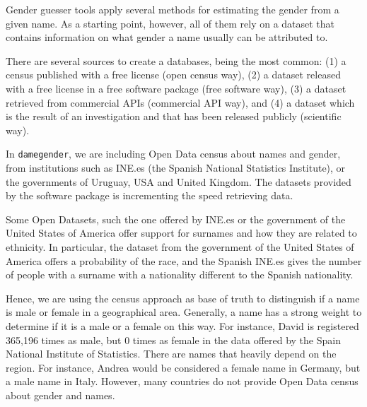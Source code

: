 \documentclass[a4paper]{article}
\begin{document}
Gender guesser tools apply several methods for estimating the gender from a given name. 
As a starting point, however, all of them rely on a dataset that contains information on what gender a name usually can be attributed to.

There are several sources to create a databases, being the most common:  
(1) a census published with a free license (open census way), 
(2) a dataset released with a free license in a free software package (free software way), 
(3) a dataset retrieved from commercial APIs (commercial API way), and
(4) a dataset which is the result of an investigation and that has been released publicly (scientific way).

In \texttt{damegender}, we are including Open Data census about names and gender, from institutions such as INE.es (the Spanish National Statistics Institute), or the governments of Uruguay, USA and United Kingdom. The datasets provided by the software package is incrementing the speed retrieving data.

Some Open Datasets, such the one offered by INE.es or the government of the United States of America offer support for surnames and how they are related to ethnicity. 
In particular, the dataset from the government of the United States of America offers a probability of the race, and the Spanish INE.es gives the number of people with a surname with a nationality different to the Spanish nationality.

Hence, we are using the census approach as base of truth to distinguish if a name is male or female in a geographical area. 
Generally, a name has a strong weight to determine if it is a male or a female on this way.
For instance, David is registered 365,196 times as male, but 0 times as female in the data offered by the Spain National Institute of Statistics.
There are names that heavily depend on the region. 
For instance, Andrea would be considered a female name in Germany, but a male name in Italy.
However, many countries do not provide Open Data census about gender and names.


\end{document}
